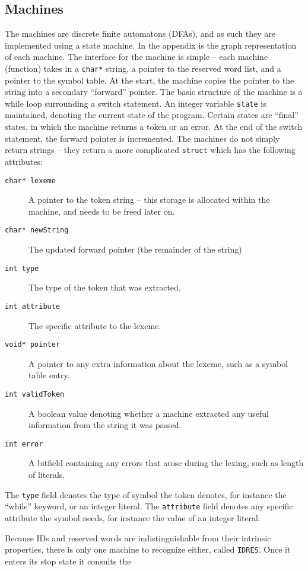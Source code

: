 \documentclass[titlepage]{article}
\begin{document}
		\subsection{Machines}
			The machines are discrete finite automatons (DFAs), and as such they are implemented using a state machine. In the appendix is the graph representation of each machine. The interface for the machine is simple -- each machine (function) takes in a \texttt{char*} string, a pointer to the reserved word list, and a pointer to the symbol table.
			At the start, the machine copies the pointer to the string into a secondary ``forward'' pointer. The basic structure of the machine is a while loop surrounding a switch statement. An integer variable \texttt{state} is maintained, denoting the current state of the program. Certain states are ``final'' states, in which the machine returns a token or an error. At the end of the switch statement, the forward pointer is incremented.
			The machines do not simply return strings -- they return a more complicated \texttt{struct} which has the following attributes:
			\begin{description}
				\item[\texttt{char* lexeme}] A pointer to the token string -- this storage is allocated within the machine, and needs to be freed later on.
				\item[\texttt{char* newString}] The updated forward pointer (the remainder of the string)
				\item[\texttt{int type}] The type of the token that was extracted.
				\item[\texttt{int attribute}] The specific attribute to the lexeme.
				\item[\texttt{void* pointer}] A pointer to any extra information about the lexeme, such as a symbol table entry.
				\item[\texttt{int validToken}] A boolean value denoting whether a machine extracted any useful information from the string it was passed.
				\item[\texttt{int error}] A bitfield containing any errors that arose during the lexing, such as length of literals.
			\end{description}
			The \texttt{type} field denotes the type of symbol the token denotes, for instance the ``while'' keyword, or an integer literal.
			The \texttt{attribute} field denotes any specific attribute the symbol needs, for instance the value of an integer literal.
			
			Because IDs and reserved words are indistinguishable from their intrinsic properties, there is only one machine to recognize either, called \texttt{IDRES}. Once it enters its stop state it consults the 
\end{document}
